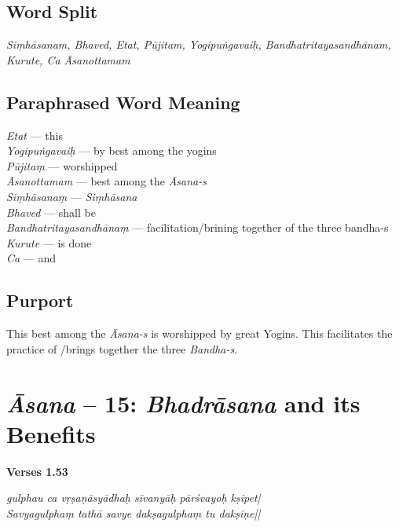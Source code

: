 \subsection*{Word Split}
\vspace{-5pt}

\textit{Siṃhāsanam,  Bhaved, Etat, Pūjitam, Yogipuṅgavaiḥ, Bandhatritayasandhānam, Kurute, Ca Āsanottamam}
\vspace{-5pt}
\subsection*{Paraphrased Word Meaning}
\vspace{-5pt}	
\begin{multicols}{2}
\textit{Etat} ---  this \\
\textit{Yogipuṅgavaiḥ} --- by best among the yogins   \\
\textit{Pūjitaṃ} ---  worshipped  \\
\textit{Āsanottamam} --- best among the \textit{Āsana-s} \\
\textit{Siṃhāsanaṃ} ---  \textit{Siṃhāsana} \\
\textit{Bhaved} ---   shall be   \\
\textit{Bandhatritayasandhānaṃ} --- facilitation/brining together of the three bandha-s   \\
\textit{Kurute} ---  is done  \\
\textit{Ca} --- and
\end{multicols}

\subsection*{Purport}

This best among the \textit{Āsana-s} is worshipped by great Yogins. This facilitates the practice of /brings together the three \textit{Bandha-s}.


\section*{\textit{Āsana} -- 15: \textit{Bhadrāsana} and its Benefits}

\noindent \textbf{Verses 1.53}

\begin{shloka}
\textit{gulphau ca vṛṣaṇāsyādhaḥ sīvanyāḥ pārśvayoḥ kṣipet|}\\
\textit{Savyagulphaṃ tathā savye dakṣagulphaṃ tu dakṣiṇe||}
\end{shloka}

